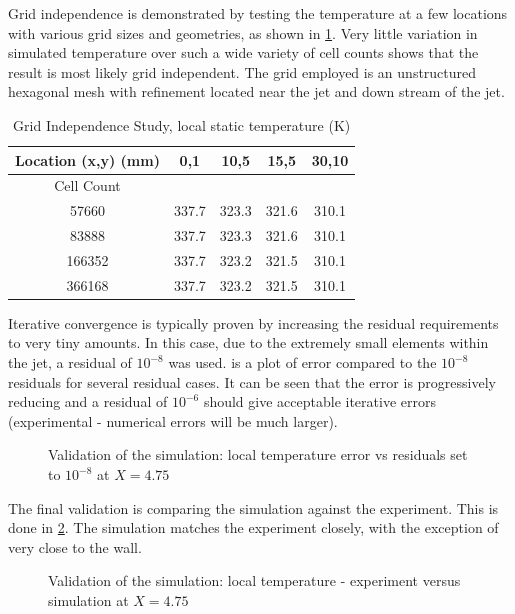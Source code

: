 \documentclass[preprint,12pt]{elsarticle}
\begin{document}
Grid independence is demonstrated by testing the temperature at a few locations with various grid sizes and geometries, as shown in \cref{tab:gridjet}.  Very little variation in simulated temperature over such a wide variety of cell counts shows that the result is most likely grid independent.  The grid employed is an unstructured hexagonal mesh with refinement located near the jet and down stream of the jet.
\begin{table}[!t!b!p]
\begin{center}
\begin{tabular}{ c c c c c }
\hline
 Location (x,y) (mm) & 0,1 & 10,5 & 15,5& 30,10 \\ \hline \hline
 Cell Count & \\ \hline
 57660  & 337.7 & 323.3 & 321.6 & 310.1 \\ \hline
 83888  & 337.7 & 323.3 & 321.6 & 310.1 \\ \hline
 166352 & 337.7 & 323.2 & 321.5 & 310.1 \\ \hline
 366168 & 337.7 & 323.2 & 321.5 & 310.1 \\ \hline
\end{tabular}
\caption{Grid Independence Study, local static temperature (K)}
\label{tab:gridjet}
\end{center}
\end{table}

Iterative convergence is typically proven by increasing the residual requirements to very tiny amounts.  In this case, due to the extremely small elements within the jet, a residual of $10^{-8}$ was used.   is a plot of error compared to the $10^{-8}$ residuals for several residual cases.  It can be seen that the error is progressively reducing and a residual of $10^{-6}$ should give acceptable iterative errors (experimental - numerical errors will be much larger).
\begin{figure}[!htbp]
	\centering
  \setlength\figureheight{7cm} 
	\setlength\figurewidth{7cm}
	
	\caption{Validation of the simulation: local temperature error vs residuals set to $10^{-8}$ at $X=4.75$}
	\label{fig:jetiterate15mm}
\end{figure}

The final validation is comparing the simulation against the experiment.  This is done in \cref{fig:jetexp15}.  The simulation matches the experiment closely, with the exception of very close to the wall.
\begin{figure}[!htbp]
	\centering
	\setlength\figureheight{7cm} 
	\setlength\figurewidth{7cm}
	
	\caption{Validation of the simulation: local temperature - experiment versus simulation at $X=4.75$}
	\label{fig:jetexp15}
\end{figure}
\end{document}
